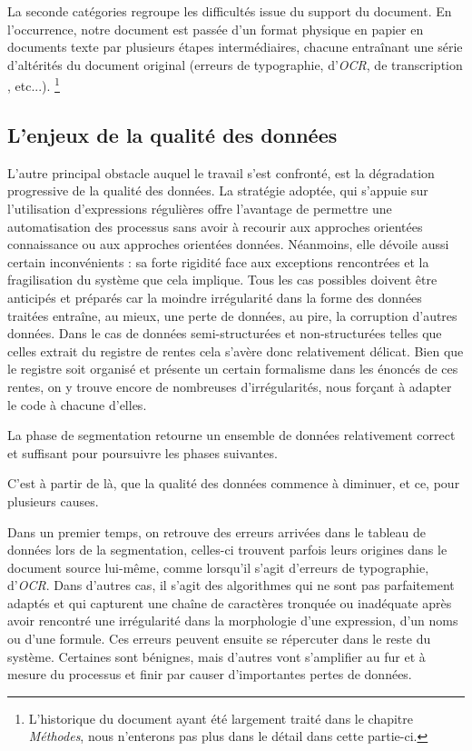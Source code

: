La seconde catégories regroupe les difficultés issue du support du document. 
En l'occurrence, notre document est passée d'un format physique en papier en documents texte par plusieurs étapes intermédiaires, chacune entraînant une série d'altérités du document original (erreurs de typographie, d'\textit{OCR}, de transcription , etc...). \footnote{L'historique du document ayant été  largement traité dans le chapitre \textit{Méthodes}, nous n'enterons pas plus dans le détail dans cette partie-ci.}

\subsection{L'enjeux de la qualité des données}
L'autre principal obstacle auquel le travail s'est confronté, est la dégradation progressive de la qualité des données.
La stratégie adoptée, qui s'appuie sur l'utilisation d'expressions régulières offre l'avantage de permettre une automatisation des processus sans avoir à recourir aux approches orientées connaissance ou aux approches orientées données. Néanmoins, elle dévoile aussi certain inconvénients : sa forte rigidité face aux exceptions rencontrées et la fragilisation du système que cela implique. Tous les cas possibles doivent être anticipés et préparés car la moindre irrégularité dans la forme des données traitées entraîne, au mieux, une perte de données, au pire, la corruption d'autres données. Dans le cas de données semi-structurées et non-structurées telles que celles extrait du registre de rentes cela s'avère donc relativement délicat. Bien que le registre soit organisé et présente un certain formalisme dans les énoncés de ces rentes, on y trouve encore de nombreuses d'irrégularités, nous forçant à adapter le code à chacune d'elles. 

La phase de segmentation retourne un ensemble de données relativement correct et suffisant pour poursuivre les phases suivantes.

C'est à partir de là, que la qualité des données commence à diminuer, et ce, pour plusieurs causes.

Dans un premier temps, on retrouve des erreurs arrivées dans le tableau de données lors de la segmentation, celles-ci trouvent parfois leurs origines dans le document source lui-même, comme lorsqu'il s'agit d'erreurs de typographie, d'\textit{OCR}.
Dans d'autres cas, il s'agit des algorithmes qui ne sont pas parfaitement adaptés et qui capturent une chaîne de caractères tronquée ou inadéquate après avoir rencontré une irrégularité dans la morphologie d'une expression, d'un noms ou d'une formule.
Ces erreurs peuvent ensuite se répercuter dans le reste du système. Certaines sont bénignes, mais d'autres vont s'amplifier au fur et à mesure du processus et finir par causer d'importantes pertes de données. 

